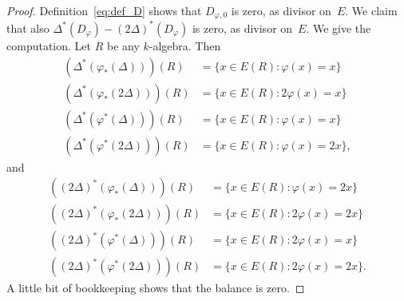 \documentclass[JEP,XML,SOM,Unicode,NoFloatCountersInSection]{cedram}
\theoremstyle{plain}
\theoremstyle{definition}
\numberwithin{equation}{subsection}
\let\phi\varphi
\begin{document}
\begin{proof}
Definition~\eqref{eq:def_D} shows that $D_{\phi,0}$ is zero, as
divisor on~$E$. We claim that also
$\Delta^*(D_\phi)-(2\Delta)^*(D_\phi)$ is zero, as divisor on~$E$. We
give the computation. Let $R$ be any $k$-algebra. Then
\begin{align*}
(\Delta^*(\phi_*(\Delta)))(R) & = \{x\in E(R) : \phi(x)=x\}\\
(\Delta^*(\phi_*(2\Delta)))(R) & = \{x\in E(R) : 2\phi(x)=x\}\\
(\Delta^*(\phi^*(\Delta)))(R) & = \{x\in E(R) : \phi(x)=x\}\\
(\Delta^*(\phi^*(2\Delta)))(R) & = \{x\in E(R) : \phi(x)=2x\},
\end{align*}
and
\begin{align*}
((2\Delta)^*(\phi_*(\Delta)))(R) & = \{x\in E(R) : \phi(x)=2x\}\\
((2\Delta)^*(\phi_*(2\Delta)))(R) & = \{x\in E(R) : 2\phi(x)=2x\}\\
((2\Delta)^*(\phi^*(\Delta)))(R) & = \{x\in E(R) : 2\phi(x)=x\}\\
((2\Delta)^*(\phi^*(2\Delta)))(R) & = \{x\in E(R) : 2\phi(x)=2x\}.
\end{align*}
A little bit of bookkeeping shows that the balance is zero.
\end{proof}

\backmatter


\end{document}
